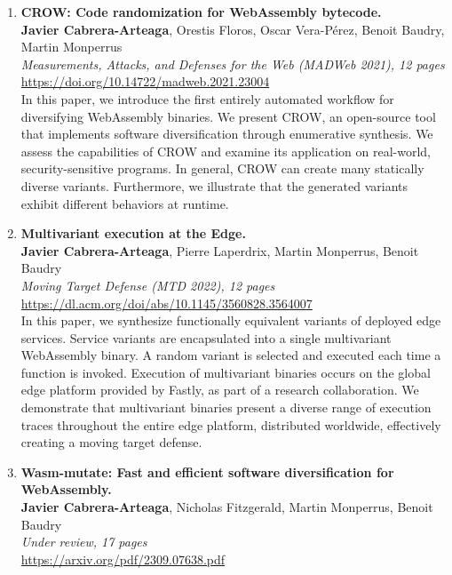 \begin{enumerate}[label={\textbf{\Roman*}:}, ref={\Roman*}]
	\item \label{crowpaper} \textbf{CROW: Code randomization for WebAssembly bytecode.} \\ 
	\textbf{Javier Cabrera-Arteaga}, Orestis Floros, Oscar Vera-Pérez, Benoit Baudry, Martin Monperrus\\
	\textit{ Measurements, Attacks, and Defenses for the Web (MADWeb 2021), 12 pages} \\
	\url{https://doi.org/10.14722/madweb.2021.23004} \\
	
	 In this paper, we introduce the first entirely automated workflow for diversifying WebAssembly binaries. 
	We present CROW, an open-source tool that implements software diversification through enumerative synthesis. 
	We assess the capabilities of CROW and examine its application on real-world, security-sensitive programs.
	In general, CROW can create many statically diverse variants. 
	Furthermore, we illustrate that the generated variants exhibit different behaviors at runtime.

	
	
	\item \label{mewepaper} \textbf{Multivariant execution at the Edge. } \\
	\textbf{Javier Cabrera-Arteaga}, Pierre Laperdrix, Martin Monperrus, Benoit Baudry\\
    \textit{Moving Target Defense (MTD 2022), 12 pages} \\
    \url{https://dl.acm.org/doi/abs/10.1145/3560828.3564007} \\

	In this paper, we synthesize functionally equivalent variants of deployed edge services. 
	Service variants are encapsulated into a single multivariant WebAssembly binary. 
	A random variant is selected and executed each time a function is invoked.
	Execution of multivariant binaries occurs on the global edge platform provided by Fastly, as part of a research collaboration. 
	We demonstrate that multivariant binaries present a diverse range of execution traces throughout the entire edge platform, distributed worldwide, effectively creating a moving target defense.

	
	\item \label{wasmmutatepaper}\textbf{Wasm-mutate: Fast and efficient software diversification for WebAssembly. }\\ 
	\textbf{Javier Cabrera-Arteaga}, Nicholas Fitzgerald, Martin Monperrus, Benoit Baudry\\
	\textit{Under review, 17 pages} \\
	\url{https://arxiv.org/pdf/2309.07638.pdf}


\end{enumerate}
